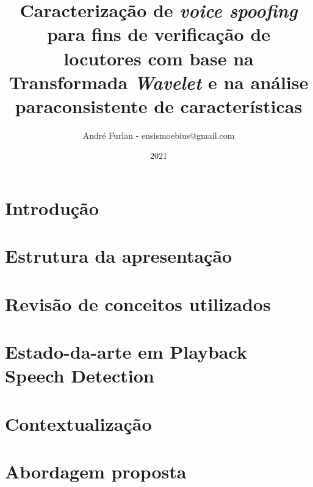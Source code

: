 

\title{Caracterização de \textit{voice spoofing} para fins de verificação de locutores com base na Transformada \textit{Wavelet} e na análise paraconsistente de características}


\author{André Furlan - ensismoebius@gmail.com}

\date{2021}


	
	\frame{\titlepage}
	
	\section{Introdução}
		

	\section{Estrutura da apresentação}
		

	\section{Revisão de conceitos utilizados}
		
		
		
		
		
		
		
	
	\section{Estado-da-arte em Playback Speech Detection}
		
		
	\section{Contextualização}
		

	\section{Abordagem proposta}
		
		
		
		
